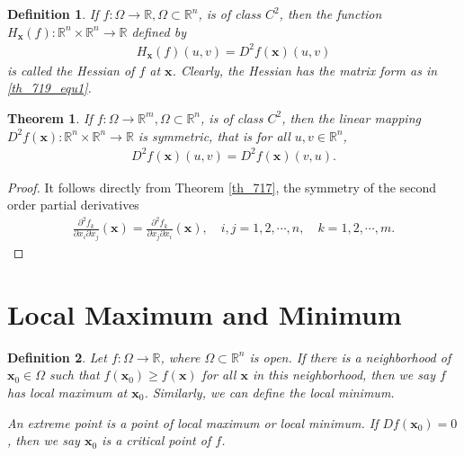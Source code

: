\documentclass[10pt]{book}
\newtheorem{definition}{Definition}[chapter]
\newtheorem{theorem}{Theorem}[chapter]
\theoremstyle{definition}
\numberwithin{equation}{chapter}
\begin{document}
\medskip

\begin{definition}
If $f: \Omega \to \mathbb{R}, \Omega \subset \mathbb{R}^n$, is of class $C^2$, then the function $H_{\mathbf{x}}(f): \mathbb{R}^n \times \mathbb{R}^n \to \mathbb{R}$ defined by
\begin{align*}
    H_{\mathbf{x}}(f)(u,v) = D^2f(\mathbf{x})(u,v)
\end{align*}
is called the Hessian of $f$ at $\mathbf{x}$. Clearly, the Hessian has the matrix form as in \eqref{th_719_equ1}.
\end{definition}

\medskip

\begin{theorem}
If $f: \Omega \to \mathbb{R}^m, \Omega \subset \mathbb{R}^n$, is of class $C^2$, then the linear mapping $D^2f(\mathbf{x}): \mathbb{R}^n \times \mathbb{R}^n \to \mathbb{R}$ is symmetric, that is for all $u, v \in \mathbb{R}^n$,
\begin{align*}
    D^2f(\mathbf{x})(u,v) = D^2f(\mathbf{x})(v,u).
\end{align*}
\end{theorem}
\begin{proof}
It follows directly from Theorem \ref{th_717}, the symmetry of the second order partial derivatives
\begin{align*}
    \frac{\partial^2 f_k}{\partial x_i \partial x_j}(\mathbf{x}) = \frac{\partial^2 f_k}{\partial x_j \partial x_i}(\mathbf{x}), \quad i,j = 1,2,\cdots,n, \quad k = 1, 2,\cdots,m.
\end{align*}
\end{proof}

\medskip



\section{Local Maximum and Minimum}

\begin{definition}
Let $f: \Omega \to \mathbb{R}$, where $\Omega \subset \mathbb{R}^n$ is open. If there is a neighborhood of $\mathbf{x}_0 \in \Omega$ such that $f(\mathbf{x}_0) \geq f(\mathbf{x})$ for all $\mathbf{x}$ in this neighborhood, then we say  $f$ has local maximum at $\mathbf{x}_0$. Similarly, we can define the local minimum.

An extreme point is a point of local maximum or local minimum. If $Df(\mathbf{x}_0) = 0$, then we say $\mathbf{x}_0$ is a critical point of $f$.
\end{definition}
\end{document}
